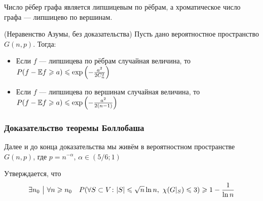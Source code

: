 \begin{note}
	Число рёбер графа является липшицевым по рёбрам, а хроматическое число графа --- липшицево по вершинам.
\end{note}

\begin{theorem} (Неравенство Азумы, без доказательства)
	Пусть дано вероятностное пространство $G(n, p)$. Тогда:
	\begin{itemize}
		\item Если $f$ --- липшицева по рёбрам случайная величина, то \(P(f - \mathbb{E} f \geqslant a) \leqslant \exp\left(-\frac{a^2}{2C_n^2}\right)\)
		
		\item Если $f$ --- липшицева по вершинам случайная величина, то \(P(f - \mathbb{E} f \geqslant a) \leqslant \exp\left(-\frac{a^2}{2(n - 1)}\right)\)
	\end{itemize}
\end{theorem}

\subsubsection*{Доказательство теоремы Боллобаша}

\begin{note}
	Далее и до конца доказательства мы живём в вероятностном пространстве $G(n, p)$, где $p = n^{-\alpha}$, $\alpha \in (5/6; 1)$
\end{note}

\begin{lemma}
	Утверждается, что
	\[
		\exists n_0 \ \big|\  \forall n \geqslant n_0 \quad P(\forall S \subset V \colon |S| \leqslant \sqrt{n}\ln n,\ \chi(G|_S) \leqslant 3) \geqslant 1 - \frac{1}{\ln n}
	\]
\end{lemma}

